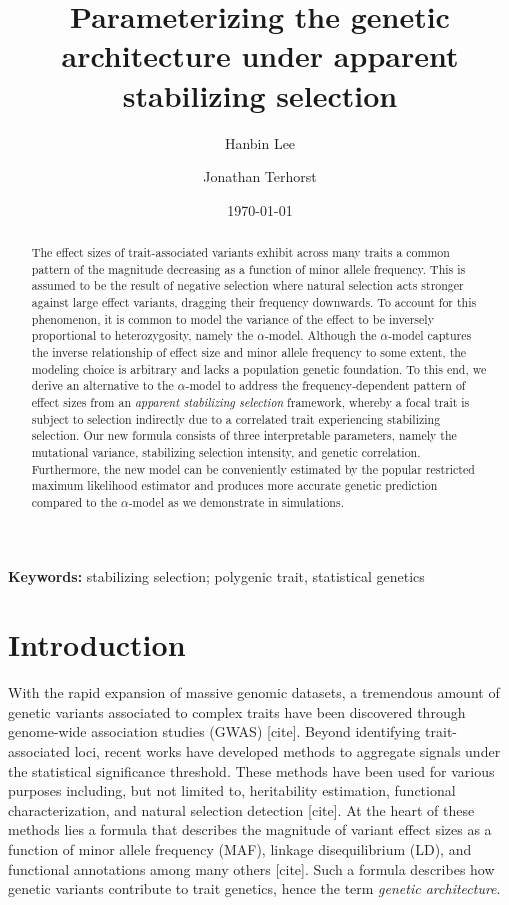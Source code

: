 \documentclass[10pt]{article}
\title{
    Parameterizing the genetic architecture under apparent stabilizing selection
}
\author[1]{Hanbin Lee}
\author[1]{Jonathan Terhorst}
\affil[1]{Department of Statistics, University of Michigan, Ann Arbor, MI, 48109, USA}
\affil[$\dagger$]{\small These authors contributed equally}
\affil[$*$]{Correspondence to \texttt{hblee@umich.edu}}
\date{\today}
\begin{document}
\maketitle

\begin{abstract}
    The effect sizes of trait-associated variants exhibit across many traits a common pattern of the magnitude decreasing as a function of minor allele frequency.
    This is assumed to be the result of negative selection where natural selection acts stronger against large effect variants, dragging their frequency downwards.
    To account for this phenomenon, it is common to model the variance of the effect to be inversely proportional to heterozygosity, namely the $\alpha$-model.
    Although the $\alpha$-model captures the inverse relationship of effect size and minor allele frequency to some extent,
    the modeling choice is arbitrary and lacks a population genetic foundation.
    To this end, we derive an alternative to the $\alpha$-model to address the frequency-dependent pattern of effect sizes from an \emph{apparent stabilizing selection} framework, whereby a focal trait is subject to selection indirectly due to a correlated trait experiencing stabilizing selection.
    Our new formula consists of three interpretable parameters, namely the mutational variance, stabilizing selection intensity, and genetic correlation.
    Furthermore, the new model can be conveniently estimated by the popular restricted maximum likelihood estimator and produces more accurate genetic prediction compared to the $\alpha$-model as we demonstrate in simulations.
\end{abstract}

\vspace{1em} 
\noindent \textbf{Keywords:} stabilizing selection; polygenic trait, statistical genetics

\section{Introduction}

With the rapid expansion of massive genomic datasets,
a tremendous amount of genetic variants associated to complex traits have been discovered through genome-wide association studies (GWAS) [cite].
Beyond identifying trait-associated loci, recent works have developed methods to aggregate signals under the statistical significance threshold.
These methods have been used for various purposes including, but not limited to,
heritability estimation, functional characterization, and natural selection detection [cite].
At the heart of these methods lies a formula that describes the magnitude of variant effect sizes as a function of minor allele frequency (MAF), linkage disequilibrium (LD), and functional annotations among many others [cite].
Such a formula describes how genetic variants contribute to trait genetics, hence the term \emph{genetic architecture}.
\end{document}
